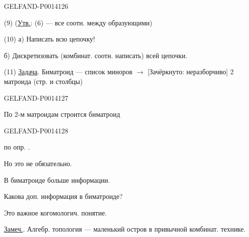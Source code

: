 \begin{GelfandAdjacentEvidence}{GELFAND-P001412}{6}


(9) (\uline{Утв.}: (6) — все соотн. между образующими)

(10) а) Написать всю цепочку!

б) Дискретизовать (комбинат. соотн. написать) всей цепочки.

(11) \uline{Задача}. Биматроид — список миноров \(\longrightarrow\)
[Зачёркнуто: неразборчиво] 2 матроида (стр. и столбцы)
\end{GelfandAdjacentEvidence}
\begin{GelfandAdjacentEvidence}{GELFAND-P001412}{7}


По 2-м матроидам строится биматроид

\end{GelfandAdjacentEvidence}
\begin{GelfandAdjacentEvidence}{GELFAND-P001412}{8}


по опр. .
\end{GelfandAdjacentEvidence}


Но это не обязательно.

В биматроиде больше информации.

Какова доп. информация в биматроиде?

Это важное когомологич. понятие.

\uline{Замеч.}. Алгебр. топология — маленький остров в привычной комбинат. технике.



